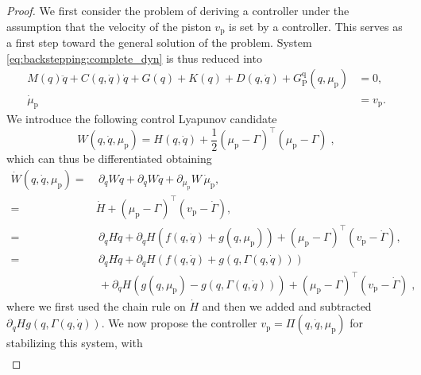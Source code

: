 \begin{proof}
	
	We first consider the problem of deriving a controller under the assumption that the velocity of the piston $v_\mathrm{p}$ is set by a controller. This serves as a first step toward the general solution of the problem. System \eqref{eq:backstepping:complete_dyn} is thus reduced into
	\begin{equation}\label{eq:backstepping:intermediate}
	\begin{split}
	M(q)\ddot{q} \! + \! C(q,\dot{q})\dot{q} \! + \! G(q) \! + \! K(q) \! + \! D(q,\dot{q}) \! + \! G_{\mathrm{P}}^{\mathrm{q}}(q,\mu_\mathrm{p}) &= 0, \\
	\dot{\mu}_\mathrm{p} &= v_\mathrm{p}. 
	\end{split}
	\end{equation}
	We introduce the following control Lyapunov candidate
	\begin{equation}
		W(q,\dot{q},\mu_\mathrm{p}) = H(q,\dot{q}) + \frac{1}{2}(\mu_\mathrm{p} - \Gamma)^{\top}(\mu_\mathrm{p} - \Gamma)\;,
	\end{equation}
	which can thus be differentiated obtaining
	\begin{equation}
		\begin{split}
			\dot{W}(q,\dot{q},\mu_\mathrm{p}) =& \: \partial_{q} W \dot{q} + \partial_{\dot{q}} W \ddot{q} + \partial_{\mu_\mathrm{p}} W \, \dot{\mu}_\mathrm{p},\\
                =& \dot{H} + (\mu_\mathrm{p} - \Gamma)^{\top}(v_\mathrm{p} - \dot\Gamma),\\
			=&  \: \partial_{q} H \dot{q} + \partial_{\dot{q}} H (f(q,\dot{q}) + g(q,\mu_\mathrm{p})) + (\mu_\mathrm{p} - \Gamma)^{\top}(v_\mathrm{p} - \dot\Gamma),\\
			=& \: \partial_{q} H \dot{q} + \partial_{\dot{q}} H (f(q,\dot{q}) + g(q,\Gamma(q,\dot{q}))) \\
			& \: + \partial_{\dot{q}} H (g(q,\mu_\mathrm{p}) - g(q,\Gamma(q,\dot{q}))) + (\mu_\mathrm{p} - \Gamma)^{\top} (v_\mathrm{p} - \dot\Gamma)\;,
		\end{split}
	\end{equation}
	where we first used the chain rule on $\dot{H}$ and then we added and subtracted $\partial_{\dot{q}} H g(q,\Gamma(q,\dot{q}))$.
	We now propose the controller $v_\mathrm{p} = \Pi(q,\dot{q},\mu_\mathrm{p})$ for stabilizing this system, with
	\begin{equation*}
		\begin{split}

\end{split}
\end{equation*}
\end{proof}
